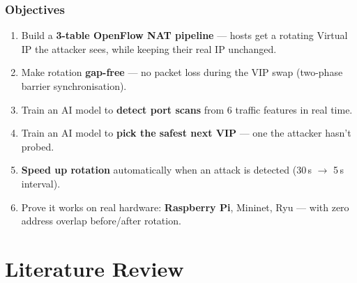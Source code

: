 \documentclass{beamer}
\begin{document}
\begin{frame}
\frametitle{Objectives}

\begin{enumerate}
  \item[\textbf{O1}] Build a \textbf{3-table OpenFlow NAT pipeline} ---
        hosts get a rotating Virtual IP the attacker sees, while keeping
        their real IP unchanged.
  \vspace{3pt}
  \item[\textbf{O2}] Make rotation \textbf{gap-free} --- no packet loss
        during the VIP swap (two-phase barrier synchronisation).
  \vspace{3pt}
  \item[\textbf{O3}] Train an AI model to \textbf{detect port scans}
        from 6 traffic features in real time.
  \vspace{3pt}
  \item[\textbf{O4}] Train an AI model to \textbf{pick the safest next VIP}
        --- one the attacker hasn't probed.
  \vspace{3pt}
  \item[\textbf{O5}] \textbf{Speed up rotation} automatically when an
        attack is detected (30\,s $\to$ 5\,s interval).
  \vspace{3pt}
  \item[\textbf{O6}] Prove it works on real hardware: \textbf{Raspberry Pi},
        Mininet, Ryu --- with zero address overlap before/after rotation.
\end{enumerate}

\end{frame}

\section{Literature Review}
\end{document}
